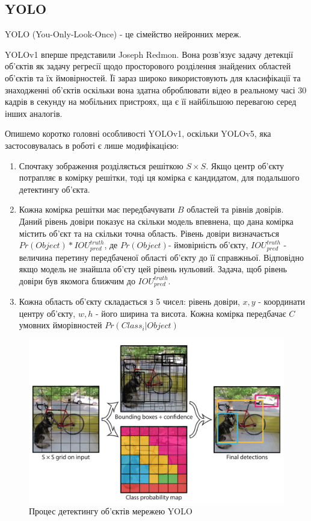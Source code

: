 \subsection{YOLO}

YOLO (You-Only-Look-Once) - це сімейство нейронних мереж.

YOLOv1 вперше представили Joseph Redmon. 
Вона розв'язує задачу детекції об'єктів як задачу регресії
щодо просторового розділення знайдених областей об'єктів та їх
ймовірностей. Її зараз широко використовують для класифікації та знаходженні об'єктів
оскільки вона здатна оброблювати відео в реальному часі 30 кадрів в секунду 
на мобільних пристроях, ща є її найбільшою перевагою серед інших аналогів.

Опишемо коротко головні особливості YOLOv1, оскільки YOLOv5, яка застосовувалась 
в роботі є лише модифікацією:
\begin{enumerate}
    \item Спочтаку зображення розділяється решіткою $S \times S$.
          Якщо центр об'єкту потрапляє в комірку решітки, тоді ця комірка
          є кандидатом, для подальшого детектингу об'єкта.
    \item Кожна комірка решітки має передбачувати $B$ областей та рівнів
          довірів. Даний рівень довіри показує на скільки модель впевнена,
          що дана комірка містить об'єкт та на скільки точна область.
          Рівень довіри визначається $Pr(Object)*{IOU}_{pred}^{truth}$, 
          де $Pr(Object)$- ймовірність об'єкту, ${IOU}_{pred}^{truth}$ - величина
          перетину передбаченої області об'єкту до її справжньої.
          Відповідно якщо модель не знайшла об'єту цей рівень нульовий.
          Задача, щоб рівень довіри був якомога ближчим до ${IOU}_{pred}^{truth}$.
    \item Кожна область об'єкту складається з 5 чисел: рівень довіри,
          $x, y$ - координати центру об'єкту,  $w, h$ - його ширина та висота.
          Кожна комірка передбачає $C$ умовних йморівностей $Pr(Class_i|Object)$
\end{enumerate}

\begin{figure}[H]
    \includegraphics[width=0.5\linewidth]{images/cnn_yolo1}
    \centering
    \caption{Процес детектингу об'єктів мережею YOLO \cite{RedmonYolo}
    }
\end{figure}

